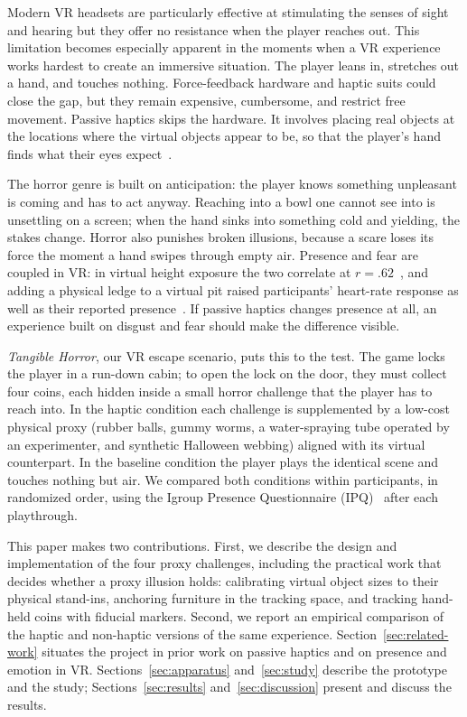
Modern VR headsets are particularly effective at stimulating the senses of sight and hearing but they offer no resistance when the player reaches out. This limitation becomes especially apparent in the moments when a VR experience works hardest to create an immersive situation. The player leans in, stretches out a hand, and touches nothing. Force-feedback hardware and haptic suits could close the gap, but they remain expensive, cumbersome, and restrict free movement. Passive haptics skips the hardware. It involves placing real objects at the locations where the virtual objects appear to be, so that the player's hand finds what their eyes expect~\cite{Insko.2001, substitutional-reality}.

The horror genre is built on anticipation: the player knows something unpleasant is coming and has to act anyway. Reaching into a bowl one cannot see into is unsettling on a screen; when the hand sinks into something cold and yielding, the stakes change. Horror also punishes broken illusions, because a scare loses its force the moment a hand swipes through empty air. Presence and fear are coupled in VR: in virtual height exposure the two correlate at $r = .62$~\cite{Gromer.2019}, and adding a physical ledge to a virtual pit raised participants' heart-rate response as well as their reported presence~\cite{Meehan.2002}. If passive haptics changes presence at all, an experience built on disgust and fear should make the difference visible.

\emph{Tangible Horror}, our VR escape scenario, puts this to the test. The game locks the player in a run-down cabin; to open the lock on the door, they must collect four coins, each hidden inside a small horror challenge that the player has to reach into.
In the haptic condition each challenge is supplemented by a low-cost physical proxy (rubber balls, gummy worms, a water-spraying tube operated by an experimenter, and synthetic Halloween webbing) aligned with its virtual counterpart. In the baseline condition the player plays the identical scene and touches nothing but air. We compared both conditions within participants, in randomized order, using the Igroup Presence Questionnaire (IPQ)~\cite{Schubert.2001} after each playthrough.

This paper makes two contributions. First, we describe the design and implementation of the four proxy challenges, including the practical work that decides whether a proxy illusion holds: calibrating virtual object sizes to their physical stand-ins, anchoring furniture in the tracking space, and tracking hand-held coins with fiducial markers. Second, we report an empirical comparison of the haptic and non-haptic versions of the same experience. Section~\ref{sec:related-work} situates the project in prior work on passive haptics and on presence and emotion in VR. Sections~\ref{sec:apparatus} and~\ref{sec:study} describe the prototype and the study; Sections~\ref{sec:results} and~\ref{sec:discussion} present and discuss the results.
